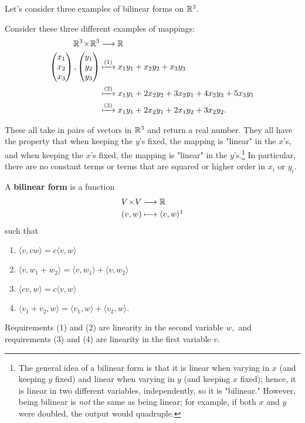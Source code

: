 Let's consider three examples of bilinear forms on $\mathbb R^3.$
\begin{example}\label{bilinear forms}

Consider these three different examples of mappings:
\begin{align*} \mathbb R^3 \hspace{0.05em}{\times}\hspace{0.05em} \mathbb R^3 &\longrightarrow \mathbb R \\
\begin{pmatrix}
x_1 \\ x_2 \\ x_3
\end{pmatrix},
\begin{pmatrix}
y_1 \\ y_2 \\ y_3
\end{pmatrix} 
& \xmapsto{(1)} x_1y_1 + x_2y_2 + x_3y_3 \\
& \xmapsto{(2)} x_1y_1 + 2x_2y_2 + 3x_2y_1 + 4x_2y_3 + 5x_3y_1 \\
& \xmapsto{(3)} x_1y_1 + 2x_2y_1 + 2x_1y_2 + 3x_2y_2.
\end{align*}

\end{example}
These all take in pairs of vectors in $\mathbb R^3$ and return a real number. They all have the property that when keeping the $y$'s fixed, the mapping is "linear" in the $x$'s, and when keeping the $x$'s fixed, the mapping is "linear" in the $y$'s.\footnote{The general idea of a bilinear form is that it is linear when varying in $x$ (and keeping $y$ fixed) and linear when varying in $y$ (and keeping $x$ fixed); hence, it is linear in two different variables, independently, so it is "bilinear." However, being bilinear is \emph{not} the same as being linear; for example, if both $x$ and $y$ were doubled, the output would quadruple.} In particular, there are no constant terms or terms that are squared or higher order in $x_i$ or $y_i$. 

\begin{definition}
A \textbf{bilinear form} is a function \begin{align*} V \by V &\rto \RR \\
(v, w) &\mto \langle v, w \rangle\footnotemark
\end{align*} 
such that 
\begin{enumerate}
    \item $\langle v, cw \rangle = c\langle  v, w\rangle $ 
    \item $\langle v, w_1 + w_2 \rangle = \langle v, w_1 \rangle + \langle v, w_2\rangle$
    \item $\langle cv, w \rangle = c\langle v, w \rangle$ 
    \item $\langle v_1 + v_2, w \rangle = \langle v_1, w \rangle + \langle v_2, w \rangle.$
\end{enumerate}

Requirements (1) and (2) are linearity in the second variable $w,$ and requirements (3) and (4) are linearity in the first variable $v.$
\end{definition}

